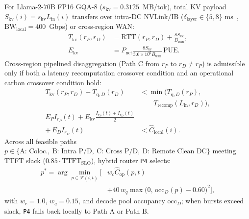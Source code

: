 For Llama-2-70B FP16 GQA-8 ($s_{\text{kv}}=0.3125$~MB/tok), total KV payload $S_{\text{kv}}(i) = s_{\text{kv}} L_{\text{in}}(i)$ transfers over intra-DC NVLink/IB ($\delta_{\text{layer}} \in \{5,8\}\text{ ms}$~\cite{patel2024splitwise}, $\text{BW}_{\text{local}}=400$~Gbps) or cross-region WAN:
\begin{equation}\label{eq:kv_tx}
\begin{aligned}
T_{\text{kv}}(r_P, r_D) &= \text{RTT}(r_P, r_D) + \frac{8 S_{\text{kv}}}{B_{\text{wan}}}, \\
E_{\text{kv}} &= P_{\text{net}}\frac{8 S_{\text{kv}}}{3.6\times 10^6 B_{\text{wan}}}\,\text{PUE}.
\end{aligned}
\end{equation}
Cross-region pipelined disaggregation (Path C from $r_P$ to $r_D \neq r_P$) is admissible only if both a latency recomputation crossover condition and an operational carbon crossover condition hold:
\begin{align}
T_{\text{kv}}(r_P, r_D) + T_{\text{q},D}(r_D) &< \min\!\big(T_{\text{q},D}(r_P),\nonumber\\
&\qquad T_{\text{recomp}}(L_{\text{in}}, r_D)\big), \label{eq:cross_lat}\\
E_P I_{r_P}(t) + E_{\text{kv}}\frac{I_{r_P}(t)+I_{r_D}(t)}{2} &\nonumber\\
+\, E_D I_{r_D}(t) &< \hat{C}_{\text{local}}(i). \label{eq:cross_carb}
\end{align}
Across all feasible paths $p \in \{\text{A: Coloc.},\allowbreak\ \text{B: Intra P/D},\allowbreak\ \text{C: Cross P/D},\allowbreak\ \text{D: Remote Clean DC}\}$ meeting TTFT slack ($0.85\cdot\text{TTFT}_{\text{SLO}}$), hybrid router \texttt{P4} selects:
\begin{equation}\label{eq:dispatch}
\begin{aligned}
p^* = \arg\min_{p \in \mathcal{F}(i,t)} \Big[ &w_c \hat{C}_{\text{op}}(p,t) \\
&+ 40\,w_q \max\!\big(0,\, \text{occ}_D(p) - 0.60\big)^2 \Big],
\end{aligned}
\end{equation}
with $w_c=1.0$, $w_q=0.15$, and decode pool occupancy $\text{occ}_D$; when bursts exceed slack, \texttt{P4} falls back locally to Path A or Path B.

